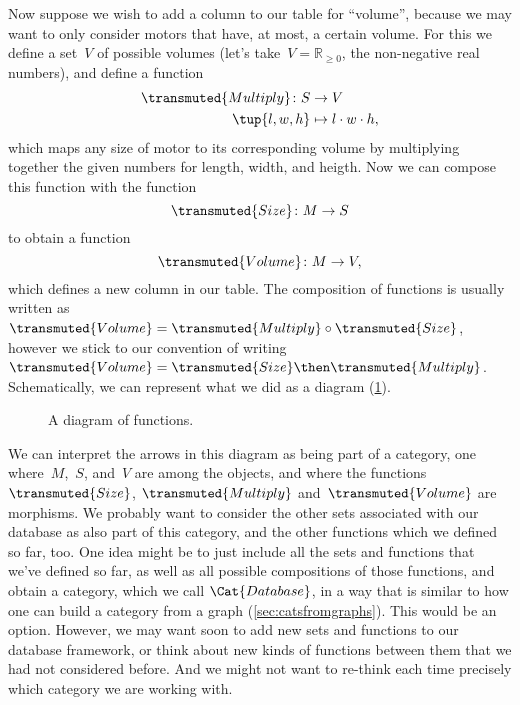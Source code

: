 Now suppose we wish to add a column to our table for ``volume'', because we may want to only consider motors that have, at most, a certain volume. For this we define a set~$V$ of possible volumes (let's take~$V = \mathbb{R}_{\geq 0}$, the non-negative real numbers), and define a function
\begin{equation*}
\begin{aligned}
\transmuted{Multiply}\colon S &\to V\\
\tup{l, w, h} &\mapsto l \cdot w \cdot h,
\end{aligned}
\end{equation*}
which maps any size of motor to its corresponding volume by multiplying together the given numbers for length, width, and heigth.  Now we can compose this function with the function
\begin{equation*}
\transmuted{Size}\colon M \to S
\end{equation*}
to obtain a function
\begin{equation*}
\transmuted{Volume}\colon M \to V,
\end{equation*}
which defines a new column in our table. The composition of functions is usually written as~$\transmuted{Volume} = \transmuted{Multiply} \circ \transmuted{Size}$, however we stick to our convention of writing~$\transmuted{Volume} = \transmuted{Size} \then \transmuted{Multiply}$. Schematically, we can represent what we did as a diagram (\cref{fig:diagram_functions}).



\begin{figure}[h!]
\begin{center}
\end{center}
\caption{A diagram of functions. \label{fig:diagram_functions}}
\end{figure}

We can interpret the arrows in this diagram as being part of a category, one where~$M$,~$S$, and~$V$ are among the objects, and where the functions~$\transmuted{Size}$, $\transmuted{Multiply}$ and~$\transmuted{Volume}$ are morphisms. We probably want to consider the other sets associated with our database as also part of this category, and the other functions which we defined so far, too. One idea might be to just include all the sets and functions that we've defined so far, as well as all possible compositions of those functions, and obtain a category, which we call $\Cat{Database}$, in a way that is similar to how one can build a category from a graph (\cref{sec:catsfromgraphs}). This would be an option. However, we may want soon to add new sets and functions to our database framework, or think about new kinds of functions between them that we had not considered before. And we might not want to re-think each time precisely which category we are working with.


